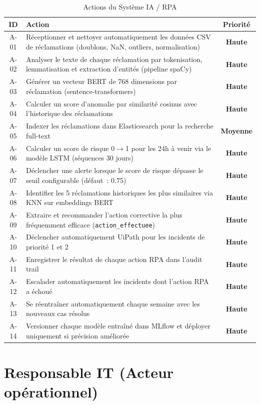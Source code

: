 \documentclass[12pt,a4paper]{report}
\newcommand{\high}{\textcolor{redAlert}{\textbf{Haute}}}
\newcommand{\medium}{\textcolor{attijariOrange}{\textbf{Moyenne}}}
\begin{document}
\begin{table}[H]
\centering
\caption{Actions du Système IA / RPA}
\begin{tabularx}{\textwidth}{|c|X|c|}
\hline
\textbf{ID} & \textbf{Action} & \textbf{Priorité} \\
\hline
A-01 & Réceptionner et nettoyer automatiquement les données CSV de réclamations (doublons, NaN, outliers, normalisation) & \high \\
\hline
A-02 & Analyser le texte de chaque réclamation par tokenisation, lemmatisation et extraction d'entités (pipeline spaCy) & \high \\
\hline
A-03 & Générer un vecteur BERT de 768 dimensions par réclamation (sentence-transformers) & \high \\
\hline
A-04 & Calculer un score d'anomalie par similarité cosinus avec l'historique des réclamations & \high \\
\hline
A-05 & Indexer les réclamations dans Elasticsearch pour la recherche full-text & \medium \\
\hline
A-06 & Calculer un score de risque 0$\rightarrow$1 pour les 24h à venir via le modèle LSTM (séquences 30 jours) & \high \\
\hline
A-07 & Déclencher une alerte lorsque le score de risque dépasse le seuil configurable (défaut~: 0.75) & \high \\
\hline
A-08 & Identifier les 5 réclamations historiques les plus similaires via KNN sur embeddings BERT & \high \\
\hline
A-09 & Extraire et recommander l'action corrective la plus fréquemment efficace (\texttt{action\_effectuee}) & \high \\
\hline
A-10 & Déclencher automatiquement UiPath pour les incidents de priorité 1 et 2 & \high \\
\hline
A-11 & Enregistrer le résultat de chaque action RPA dans l'audit trail & \high \\
\hline
A-12 & Escalader automatiquement les incidents dont l'action RPA a échoué & \high \\
\hline
A-13 & Se réentraîner automatiquement chaque semaine avec les nouveaux cas résolus & \high \\
\hline
A-14 & Versionner chaque modèle entraîné dans MLflow et déployer uniquement si précision améliorée & \high \\
\hline
\end{tabularx}
\end{table}

\section{Responsable IT (Acteur opérationnel)}
\end{document}

